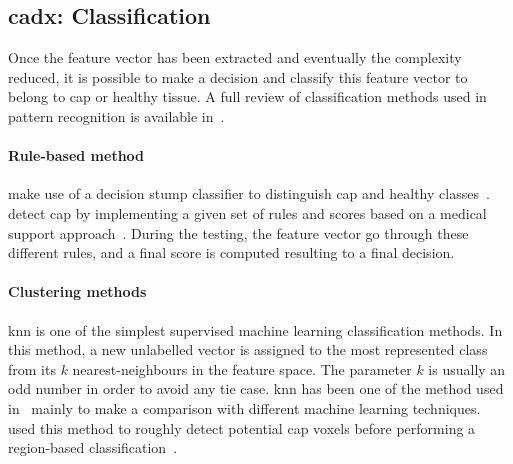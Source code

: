 \subsection{\acs*{cadx}: Classification} \label{subsec:chp3:img-clas:CADX-clas}


Once the feature vector has been extracted and eventually the complexity reduced, it is possible to make a decision and classify this feature vector to belong to \ac{cap} or healthy tissue.
A full review of classification methods used in pattern recognition is available in~\cite{Bishop2006}.

\paragraph{Rule-based method}
\citeauthor{Lv2009} make use of a decision stump classifier to distinguish \ac{cap} and healthy classes~\cite{Lv2009}. 
\citeauthor{Puech2009} detect \ac{cap} by implementing a given set of rules and scores based on a medical support approach~\cite{Puech2009}.
During the testing, the feature vector go through these different rules, and a final score is computed resulting to a final decision.

\paragraph{Clustering methods}
\acf{knn} is one of the simplest supervised machine learning classification methods.
In this method, a new unlabelled vector is assigned to the most represented class from its $k$ nearest-neighbours in the feature space.
The parameter $k$ is usually an odd number in order to avoid any tie case.
\ac{knn} has been one of the method used in~\cite{Niaf2011,Niaf2012,rampun2016computerb} mainly to make a comparison with different machine learning techniques.
\citeauthor{Litjens2012} used this method to roughly detect potential \ac{cap} voxels before performing a region-based classification~\cite{Litjens2012}.

